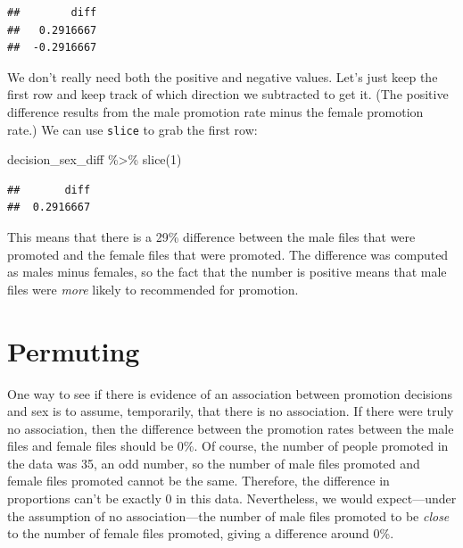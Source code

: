 \documentclass[
]{book}
\newenvironment{Shaded}{\begin{snugshade}}{\end{snugshade}}
\newcommand{\DecValTok}[1]{\textcolor[rgb]{0.00,0.00,0.81}{#1}}
\newcommand{\FunctionTok}[1]{\textcolor[rgb]{0.00,0.00,0.00}{#1}}
\newcommand{\NormalTok}[1]{#1}
\newcommand{\SpecialCharTok}[1]{\textcolor[rgb]{0.00,0.00,0.00}{#1}}
\begin{document}
\begin{verbatim}
##        diff
##   0.2916667
##  -0.2916667
\end{verbatim}

We don't really need both the positive and negative values. Let's just keep the first row and keep track of which direction we subtracted to get it. (The positive difference results from the male promotion rate minus the female promotion rate.) We can use \texttt{slice} to grab the first row:

\begin{Shaded}
\begin{Highlighting}[]
\NormalTok{decision\_sex\_diff }\SpecialCharTok{\%\textgreater{}\%}
    \FunctionTok{slice}\NormalTok{(}\DecValTok{1}\NormalTok{)}
\end{Highlighting}
\end{Shaded}

\begin{verbatim}
##       diff
##  0.2916667
\end{verbatim}

This means that there is a 29\% difference between the male files that were promoted and the female files that were promoted. The difference was computed as males minus females, so the fact that the number is positive means that male files were \emph{more} likely to recommended for promotion.

\hypertarget{randomization2-permuting}{%
\section{Permuting}\label{randomization2-permuting}}

One way to see if there is evidence of an association between promotion decisions and sex is to assume, temporarily, that there is no association. If there were truly no association, then the difference between the promotion rates between the male files and female files should be 0\%. Of course, the number of people promoted in the data was 35, an odd number, so the number of male files promoted and female files promoted cannot be the same. Therefore, the difference in proportions can't be exactly 0 in this data. Nevertheless, we would expect---under the assumption of no association---the number of male files promoted to be \emph{close} to the number of female files promoted, giving a difference around 0\%.
\end{document}
